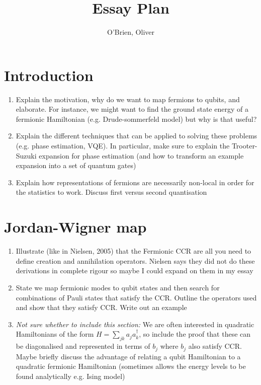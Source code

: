 \documentclass[twoside]{article}
\begin{document}
\title{Essay Plan}
\author{ O'Brien, Oliver}

\maketitle
\section{Introduction}
\begin{enumerate}
        \item Explain the motivation, why do we want to map fermions to qubits, and elaborate. For instance, we might want to find the ground state energy of a fermionic Hamiltonian (e.g. Drude-sommerfeld model) but why is that useful?
        \item Explain the different techniques that can be applied to solving these problems (e.g. phase estimation, VQE). In particular, make sure to explain the Trooter-Suzuki expansion for phase estimation (and how to transform an example expansion into a set of quantum gates)
        \item Explain how representations of fermions are necessarily non-local in order for the statistics to work. Discuss first versus second quantisation
\end{enumerate}
\section{Jordan-Wigner map}
\begin{enumerate}
        \item Illustrate (like in Nielsen, 2005) that the Fermionic CCR are all you need to define creation and annihilation operators. Nielsen says they did not do these derivations in complete rigour so maybe I could expand on them in my essay
        \item State we map fermionic modes to qubit states and then search for combinations of Pauli states that satisfy the CCR. Outline the operators used and show that they satisfy CCR. Write out an example
        \item  \textit{Not sure whether to include this section:} We are often interested in quadratic Hamiltonians of the form $H = \sum_{jk} a_j a^{\dagger}_k$, so include the proof that these can be diagonalised and represented in terms of $b_j$ where $b_j$ also satisfy CCR. Maybe briefly discuss the advantage of relating a qubit Hamiltonian to a quadratic fermionic Hamiltonian (sometimes allows the energy levels to be found analytically e.g. Ising model)
\end{enumerate}
\end{document}
